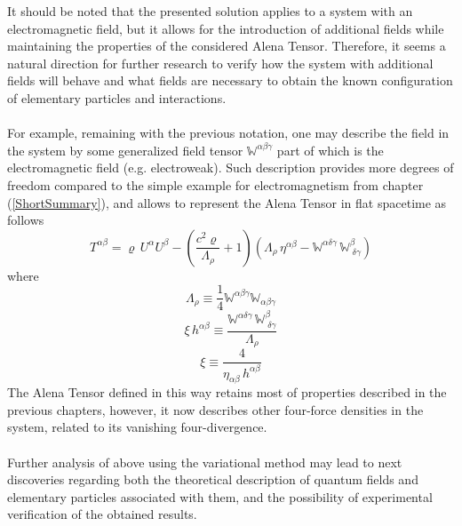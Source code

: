 \documentclass[aps,prx,preprint,groupedaddress,showkeys]{revtex4-2}
\begin{document}
It should be noted that the presented solution applies to a system with an electromagnetic field, but it allows for the introduction of additional fields while maintaining the properties of the considered Alena Tensor. Therefore, it seems a natural direction for further research to verify how the system with additional fields will behave and what fields are necessary to obtain the known configuration of elementary particles and interactions.\\
~\\
For example, remaining with the previous notation, one may describe the field in the system by some generalized field tensor $\mathbb{W}^{\alpha \beta \gamma}$ part of which is the electromagnetic field (e.g. electroweak). Such description provides more degrees of freedom compared to the simple example for electromagnetism from chapter (\ref{ShortSummary}), and allows to represent the Alena Tensor in flat spacetime as follows
\begin{equation} \label{GEN1}
T^{\alpha \beta} =  \varrho \, U^{\alpha} U^{\beta} - \left ( \frac{c^2 \varrho}{\Lambda_{\rho}} +  1  \right ) \left ( \Lambda_{\rho} \, \eta^{\alpha \beta} - \mathbb{W}^{\alpha \delta \gamma} \, \mathbb{W}^{ \beta}_{ \; \delta  \gamma} \right )  
\end{equation}
where 
\begin{equation} \label{GEN2}
\Lambda_{\rho} \equiv \frac{1}{4} \mathbb{W}^{\alpha \beta \gamma} \mathbb{W}_{\alpha \beta \gamma}
\end{equation}
\begin{equation} \label{GEN3}
\xi \, h^{\alpha \beta} \equiv \frac{\mathbb{W}^{\alpha \delta \gamma} \, \mathbb{W}^{ \beta}_{ \; \delta  \gamma}}{\Lambda_{\rho}}
\end{equation}
\begin{equation} \label{GEN4}
\xi \equiv \frac{4}{\eta_{\alpha \beta} \, h^{\alpha \beta } }
\end{equation}
The Alena Tensor defined in this way retains most of properties described in the previous chapters, however, it now describes other four-force densities in the system, related to its vanishing four-divergence.\\
~\\
Further analysis of above using the variational method may lead to next discoveries regarding both the theoretical description of quantum fields and elementary particles associated with them, and the possibility of experimental verification of the obtained results.\\
\end{document}
